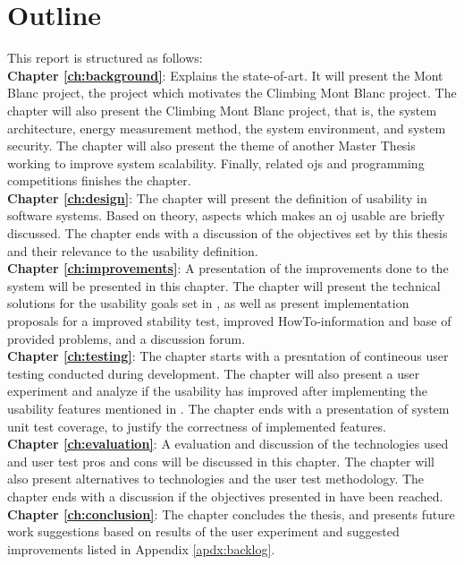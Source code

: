 

\section{Outline}
\label{sec:out}
This report is structured as follows:\\

\textbf{Chapter \ref{ch:background}}: Explains the state-of-art. It will present the Mont Blanc project, the project which motivates the Climbing Mont Blanc project. The chapter will also present the Climbing Mont Blanc project, that is, the system architecture, energy measurement method, the system environment, and system security. The chapter will also present the theme of another Master Thesis working to improve system scalability. Finally, related \glspl{oj} and programming competitions finishes the chapter. \\

\textbf{Chapter \ref{ch:design}}: The chapter will present the definition of usability in software systems. Based on theory, aspects which makes an \gls{oj} usable are briefly discussed. The chapter ends with a discussion of the objectives set by this thesis and their relevance to the usability definition. \\

\textbf{Chapter \ref{ch:improvements}}: A presentation of the improvements done to the system will be presented in this chapter. The chapter will present the technical solutions for the usability goals set in , as well as present implementation proposals for a improved stability test, improved HowTo-information and base of provided problems, and a discussion forum. \\

\textbf{Chapter \ref{ch:testing}}: The chapter starts with a presntation of contineous user testing conducted during development. The chapter will also present a user experiment and analyze if the usability has improved after implementing the usability features mentioned in . The chapter ends with a presentation of system unit test coverage, to justify the correctness of implemented features. \\

\textbf{Chapter \ref{ch:evaluation}}: A evaluation and discussion of the technologies used and user test pros and cons will be discussed in this chapter. The chapter will also present alternatives to technologies and the user test methodology. The chapter ends with a discussion if the objectives presented in  have been reached. \\

\textbf{Chapter \ref{ch:conclusion}}: The chapter concludes the thesis, and presents future work suggestions based on results of the user experiment and suggested improvements listed in Appendix \ref{apdx:backlog}.



